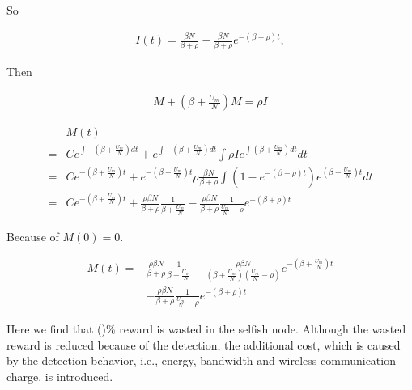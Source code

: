So
\begin{small}
\begin{equation}
\nonumber
\begin{aligned}
I(t) = \frac{ \beta N }{ \beta + \rho } - \frac{ \beta N }{ \beta + \rho } e^{-(\beta + \rho)t},
\end{aligned}
\end{equation}
\end{small}
Then
\begin{small}
\begin{equation}
\nonumber
\begin{aligned}
\dot{M} + (\beta + \frac{U_{m}}{N})M = \rho I
\end{aligned}
\end{equation}
\end{small}

\begin{small}
\begin{equation}
\nonumber
\begin{aligned}
& M(t) \\
=& C e^{\int -(\beta + \frac{U_{m}}{N}) dt} + e^{\int -(\beta + \frac{U_{m}}{N}) dt} \int \rho I e^{\int (\beta + \frac{U_{m}}{N}) dt} dt \\
=& C e^{-(\beta + \frac{U_{m}}{N})t} + e^{-(\beta + \frac{U_{m}}{N})t} \rho \frac{ \beta N }{ \beta + \rho }  \int ( 1 - e^{-(\beta + \rho)t} ) e^{(\beta + \frac{U_{m}}{N})t} dt \\
=& C e^{-(\beta + \frac{U_{m}}{N})t} + \frac{ \rho \beta N }{ \beta + \rho } \frac{1}{\beta + \frac{U_{m}}{N}}
- \frac{ \rho \beta N }{ \beta + \rho } \frac{1}{\frac{U_{m}}{N} - \rho} e^{-(\beta + \rho)t}
\end{aligned}
\end{equation}
\end{small}
Because of $M(0) = 0$.
\begin{small}
\begin{equation}
\nonumber
\begin{aligned}
M(t) =& \frac{ \rho \beta N }{ \beta + \rho } \frac{1}{\beta + \frac{U_{m}}{N}}
- \frac{\rho \beta N}{(\beta + \frac{U_{m}}{N})(\frac{U_{m}}{N} - \rho)}  e^{-(\beta + \frac{U_{m}}{N})t}\\
& - \frac{ \rho \beta N }{ \beta + \rho } \frac{1}{\frac{U_{m}}{N} - \rho} e^{-(\beta + \rho)t}
\end{aligned}
\end{equation}
\end{small}

Here we find that ()\% reward is wasted in the selfish node.
Although the wasted reward is reduced because of the detection,
the additional cost,
which is caused by the detection behavior,
i.e., energy, bandwidth and wireless communication charge.
is introduced.
